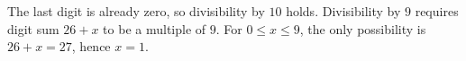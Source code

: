 The last digit is already zero, so divisibility by $10$ holds. Divisibility by $9$ requires digit sum $26+x$ to be a multiple of $9$. For $0\le x\le9$, the only possibility is $26+x=27$, hence $\boxed{x=1}$.

